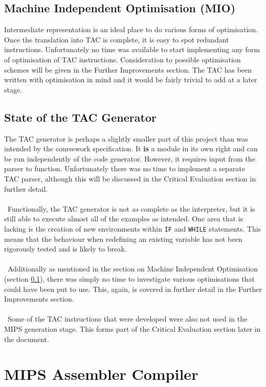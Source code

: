 \subsection{Machine Independent Optimisation (MIO)}
\label{sec:MIO}
Intermediate representation is an ideal place to do various forms of optimisation. Once the translation into TAC is complete, it is easy to spot redundant instructions. Unfortunately no time was available to start implementing any form of optimisation of TAC instructions. Consideration to possible optimisation schemes will be given in the Further Improvements section. The TAC has been written with optimisation in mind and it would be fairly trivial to add at a later stage.

\subsection{State of the TAC Generator}
The TAC generator is perhaps a slightly smaller part of this project than was intended by the coursework specification. It \textbf{is} a module in its own right and can be run independently of the code generator. However, it requires input from the parser to function. Unfortunately there was no time to implement a separate TAC parser, although this will be discussed in the Critical Evaluation section in further detail.
\\ \ \\ \
Functionally, the TAC generator is not \emph{as} complete as the interpreter, but it is still able to execute almost all of the examples as intended. One area that is lacking is the creation of new environments within \verb!IF! and \verb!WHILE! statements. This means that the behaviour when redefining an existing variable has not been rigorously tested and is likely to break.
\\ \ \\ \
Additionally as mentioned in the section on Machine Independent Optimisation (section \ref{sec:MIO}), there was simply no time to investigate various optimisations that could have been put to use. This, again, is covered in further detail in the Further Improvements section.
\\ \ \\ \
Some of the TAC instructions that were developed were also not used in the MIPS generation stage. This forms part of the Critical Evaluation section later in the document.
\newpage
\section{MIPS Assembler Compiler}
\label{sec:MIPS}